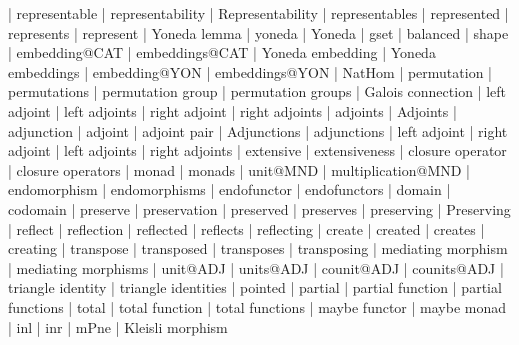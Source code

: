     |   representable
    |   representability
    |   Representability
    |   representables
    |   represented
    |   represents
    |   represent
    |   Yoneda lemma
    |   yoneda
    |   Yoneda
    |   gset
    |   balanced
    |   shape
    |   embedding@CAT
    |   embeddings@CAT
    |   Yoneda embedding
    |   Yoneda embeddings
    |   embedding@YON
    |   embeddings@YON
    |   NatHom
    |   permutation
    |   permutations
    |   permutation group
    |   permutation groups
    |   Galois connection
    |   left adjoint
    |   left adjoints
    |   right adjoint
    |   right adjoints
    |   adjoints
    |   Adjoints
    |   adjunction
    |   adjoint
    |   adjoint pair
    |   Adjunctions
    |   adjunctions
    |   left adjoint
    |   right adjoint
    |   left adjoints
    |   right adjoints
    |   extensive
    |   extensiveness
    |   closure operator
    |   closure operators
    |   monad
    |   monads
    |   unit@MND
    |   multiplication@MND
    |   endomorphism
    |   endomorphisms
    |   endofunctor
    |   endofunctors
    |   domain
    |   codomain
    |   preserve
    |   preservation
    |   preserved
    |   preserves
    |   preserving
    |   Preserving
    |   reflect
    |   reflection
    |   reflected
    |   reflects
    |   reflecting
    |   create
    |   created
    |   creates
    |   creating
    |   transpose
    |   transposed
    |   transposes
    |   transposing
    |   mediating morphism
    |   mediating morphisms
    |   unit@ADJ
    |   units@ADJ  
    |   counit@ADJ
    |   counits@ADJ
    |   triangle identity
    |   triangle identities
    |   pointed
    |   partial
    |   partial function
    |   partial functions
    |   total
    |   total function
    |   total functions
    |   maybe functor
    |   maybe monad
    |   inl
    |   inr
    |   mPne
    |   Kleisli morphism
